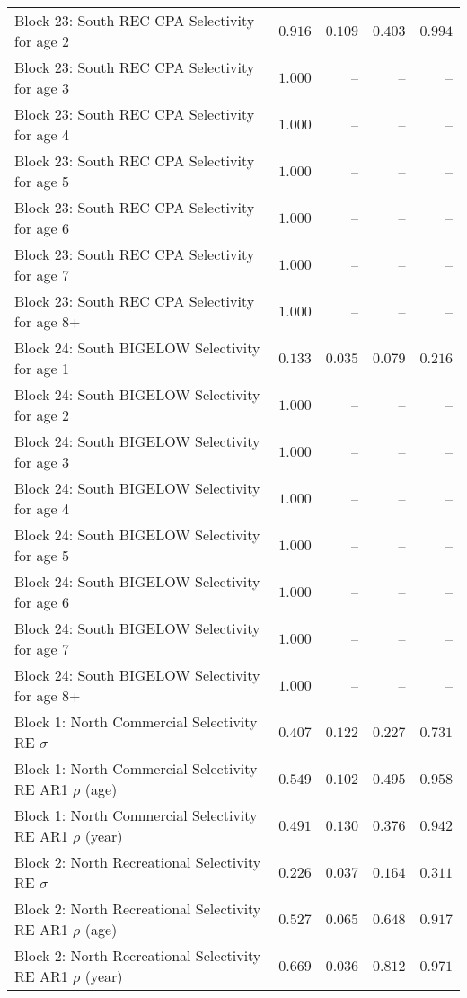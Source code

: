 \documentclass[
]{article}
\begin{document}
\begin{landscape}
\begin{longtable}[t]{lrrrr}
Block 23: South REC CPA Selectivity for age 2 & $0.916$ & $0.109$ & $0.403$ & $0.994$\\
\addlinespace
Block 23: South REC CPA Selectivity for age 3 & $1.000$ & -- & -- & --\\
Block 23: South REC CPA Selectivity for age 4 & $1.000$ & -- & -- & --\\
Block 23: South REC CPA Selectivity for age 5 & $1.000$ & -- & -- & --\\
Block 23: South REC CPA Selectivity for age 6 & $1.000$ & -- & -- & --\\
Block 23: South REC CPA Selectivity for age 7 & $1.000$ & -- & -- & --\\
\addlinespace
Block 23: South REC CPA Selectivity for age 8+ & $1.000$ & -- & -- & --\\
Block 24: South BIGELOW Selectivity for age 1 & $0.133$ & $0.035$ & $0.079$ & $0.216$\\
Block 24: South BIGELOW Selectivity for age 2 & $1.000$ & -- & -- & --\\
Block 24: South BIGELOW Selectivity for age 3 & $1.000$ & -- & -- & --\\
Block 24: South BIGELOW Selectivity for age 4 & $1.000$ & -- & -- & --\\
\addlinespace
Block 24: South BIGELOW Selectivity for age 5 & $1.000$ & -- & -- & --\\
Block 24: South BIGELOW Selectivity for age 6 & $1.000$ & -- & -- & --\\
Block 24: South BIGELOW Selectivity for age 7 & $1.000$ & -- & -- & --\\
Block 24: South BIGELOW Selectivity for age 8+ & $1.000$ & -- & -- & --\\
Block 1: North Commercial Selectivity RE $\sigma$ & $0.407$ & $0.122$ & $0.227$ & $0.731$\\
\addlinespace
Block 1: North Commercial Selectivity RE AR1 $\rho$ (age) & $0.549$ & $0.102$ & $0.495$ & $0.958$\\
Block 1: North Commercial Selectivity RE AR1 $\rho$ (year) & $0.491$ & $0.130$ & $0.376$ & $0.942$\\
Block 2: North Recreational Selectivity RE $\sigma$ & $0.226$ & $0.037$ & $0.164$ & $0.311$\\
Block 2: North Recreational Selectivity RE AR1 $\rho$ (age) & $0.527$ & $0.065$ & $0.648$ & $0.917$\\
Block 2: North Recreational Selectivity RE AR1 $\rho$ (year) & $0.669$ & $0.036$ & $0.812$ & $0.971$\\

\end{longtable}
\end{landscape}
\end{document}
